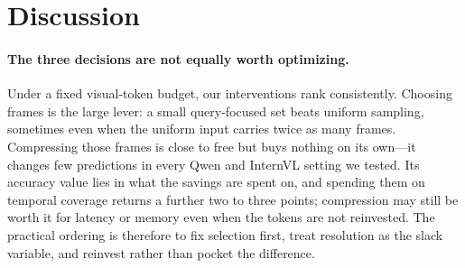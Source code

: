 \documentclass[11pt]{article}
\begin{document}
\section{Discussion}
\label{sec:discussion}

\paragraph{The three decisions are not equally worth optimizing.}
Under a fixed visual-token budget, our interventions rank consistently.
Choosing frames is the large lever: a small query-focused set beats uniform sampling, sometimes even when the uniform input carries twice as many frames.
Compressing those frames is close to free but buys nothing on its own---it changes few predictions in every Qwen and InternVL setting we tested.
Its accuracy value lies in what the savings are spent on, and spending them on temporal coverage returns a further two to three points; compression may still be worth it for latency or memory even when the tokens are not reinvested.
The practical ordering is therefore to fix selection first, treat resolution as the slack variable, and reinvest rather than pocket the difference.
\end{document}
